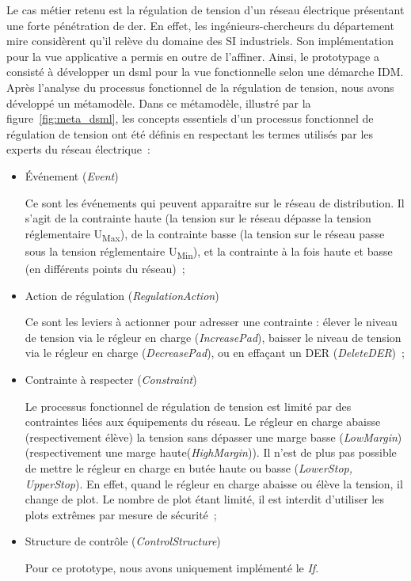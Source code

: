 Le cas métier retenu est la régulation de tension d'un réseau électrique présentant une forte pénétration de \gls{der}. En effet, les ingénieurs-chercheurs du département \gls{mire} considèrent qu'il relève du domaine des SI industriels. Son implémentation pour la vue applicative a permis en outre de l'affiner. 
Ainsi, le prototypage a consisté à développer un \gls{dsml} pour la vue fonctionnelle selon une démarche IDM. Après l'analyse du processus fonctionnel de la régulation de tension, nous avons développé un métamodèle. Dans ce métamodèle, illustré par la figure~\ref{fig:meta_dsml}, les concepts essentiels d'un processus fonctionnel de régulation de tension ont été définis en respectant les termes utilisés par les experts du réseau électrique~:

\begin{itemize}
  \item Événement (\textit{Event})

Ce sont les événements qui peuvent apparaitre sur le réseau de distribution. Il
s'agit de la contrainte haute (la tension sur le réseau dépasse la tension
réglementaire U\textsubscript{Max}), de la contrainte basse (la tension sur le
réseau passe sous la tension réglementaire U\textsubscript{Min}), et la contrainte à la
fois haute et basse (en différents points du réseau)~;

\item Action de régulation (\textit{RegulationAction})

Ce sont les leviers à actionner pour adresser une contrainte : élever le niveau
de tension via le régleur en charge (\textit{IncreasePad}), baisser le niveau de
tension via le régleur en charge (\textit{DecreasePad}), ou en effaçant un DER
(\textit{DeleteDER})~;

\item Contrainte à respecter (\textit{Constraint})

Le processus fonctionnel de régulation de tension est limité par des contraintes
liées aux équipements du réseau. Le régleur en charge abaisse (respectivement
élève) la tension sans dépasser une marge basse (\textit{LowMargin}) (respectivement une
marge haute(\textit{HighMargin})). Il n'est de plus pas possible de mettre le
régleur en charge en butée haute ou basse (\textit{LowerStop, UpperStop}). En
effet, quand le régleur en charge abaisse ou élève la tension, il change de
plot. Le nombre de plot étant limité, il est interdit d'utiliser les plots
extrêmes par mesure de sécurité~;

\item Structure de contrôle (\textit{ControlStructure})

Pour ce prototype, nous avons uniquement implémenté le \textit{If}.

\end{itemize}
		
